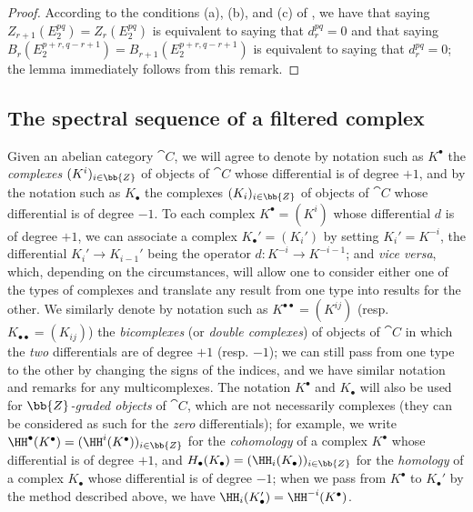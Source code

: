 \begin{proof}
According to the conditions (a), (b), and (c) of , we have that saying $Z_{r+1}(E_2^{pq})=Z_r(E_2^{pq})$ is equivalent to saying that $d_r^{pq}=0$ and that saying $B_r(E_2^{p+r,q-r+1})=B_{r+1}(E_2^{p+r,q-r+1})$ is equivalent to saying that $d_r^{pq}=0$; the lemma immediately follows from this remark.
\end{proof}

\subsection{The spectral sequence of a filtered complex}
\label{subsection:0.11.2}

\begin{env}[11.2.1]
\label{0.11.2.1}
Given an abelian category $\cat{C}$, we will agree to denote by notation such as $K^\bullet$ the \emph{complexes $(K^i)_{i\in\bb{Z}}$} of objects of $\cat{C}$ whose differential is of degree $+1$, and by the notation such as $K_\bullet$ the complexes $(K_i)_{i\in\bb{Z}}$ of objects of $\cat{C}$ whose differential is of degree $-1$.
To each complex $K^\bullet=(K^i)$ whose differential $d$ is of degree $+1$, we can associate a complex $K_\bullet'=(K_i')$ by setting $K_i'=K^{-i}$, the differential $K_i'\to K_{i-1}'$ being the operator $d:K^{-i}\to K^{-i-1}$; and \emph{vice versa}, which, depending on the circumstances, will allow one to consider either one of the types of complexes and translate  any result from one type into results for the other.
We similarly denote by notation such as $K^{\bullet\bullet}=(K^{ij})$ (resp. $K_{\bullet\bullet}=(K_{ij})$) the \emph{bicomplexes} (or \emph{double complexes}) of objects of $\cat{C}$ in which the \emph{two} differentials are of degree $+1$ (resp. $-1$); we can still pass from one type to the other by changing the signs of the indices, and we have similar notation and remarks for any multicomplexes.
The notation $K^\bullet$ and $K_\bullet$ will also be used for \emph{$\bb{Z}$-graded objects} of $\cat{C}$, which are not necessarily complexes (they can be considered as such for the \emph{zero} differentials); for example, we write $\HH^\bullet(K^\bullet)=(\HH^i(K^\bullet))_{i\in\bb{Z}}$ for the \emph{cohomology} of a complex $K^\bullet$ whose differential is of degree $+1$, and $H_\bullet(K_\bullet)=(\HH_i(K_\bullet))_{i\in\bb{Z}}$ for the \emph{homology} of a complex $K_\bullet$ whose differential is of degree $-1$; when we pass from $K^\bullet$ to $K_\bullet'$ by the method described above, we have $\HH_i(K_\bullet')=\HH^{-i}(K^\bullet)$.


\end{env}
